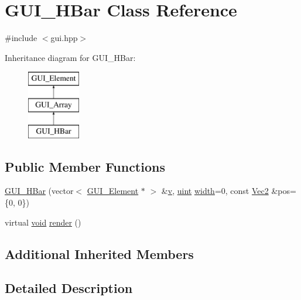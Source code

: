 \hypertarget{class_g_u_i___h_bar}{\section{G\-U\-I\-\_\-\-H\-Bar Class Reference}
\label{class_g_u_i___h_bar}
}


{\ttfamily \#include $<$gui.\-hpp$>$}

Inheritance diagram for G\-U\-I\-\_\-\-H\-Bar\-:\begin{figure}[H]
\begin{center}
\leavevmode
\includegraphics[height=3.000000cm]{class_g_u_i___h_bar}
\end{center}
\end{figure}
\subsection*{Public Member Functions}
\begin{DoxyCompactItemize}
\item 
\hyperlink{class_g_u_i___h_bar_adab95f5e1e3ff4596d2affe41efb4776}{G\-U\-I\-\_\-\-H\-Bar} (vector$<$ \hyperlink{class_g_u_i___element}{G\-U\-I\-\_\-\-Element} $\ast$ $>$ \&\hyperlink{_s_d_l__opengl_8h_a10a82eabcb59d2fcd74acee063775f90}{v}, \hyperlink{common_8hpp_a69aa29b598b851b0640aa225a9e5d61d}{uint} \hyperlink{_s_d_l__opengl_8h_a9a82cf3caff84cabc4598e2619faac17}{width}=0, const \hyperlink{class_vec2}{Vec2} \&pos=\{0, 0\})
\item 
virtual \hyperlink{_s_d_l__opengles2__gl2ext_8h_ae5d8fa23ad07c48bb609509eae494c95}{void} \hyperlink{class_g_u_i___h_bar_a9770330eb8c7a5292f2de46c0a9d2ee3}{render} ()
\end{DoxyCompactItemize}
\subsection*{Additional Inherited Members}


\subsection{Detailed Description}


